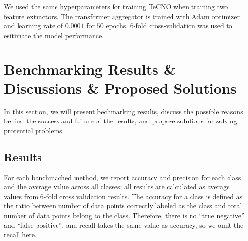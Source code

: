 \documentclass[11pt]{article} \usepackage[top=1in, bottom=1in, left=1in, right=1in]{geometry}
\begin{document}
\vspace{0.25cm}
\noindent
We used the same hyperparameters for training TeCNO when training two feature extractors. The transformer aggregator is trained with Adam optimizer and learning rate of $0.0001$ for $50$ epochs. 6-fold cross-validation was used to esitimate the model performance. 

\section{Benchmarking Results \& Discussions \& Proposed Solutions}
In this section, we will present bechmarking results, discuss the possible reasons behind the success and failure of the results, and propose solutions for solving protential problems.
\subsection{Results}
For each banchmached method, we report accuracy and precision for each class and the average value across all classes; all results are calculated as average values from 6-fold cross validation results. The accuracy for a class is defined as the ratio between number of data points correctly labeled as the class and total number of data points belong to the class. Therefore, there is no ``true negative'' and ``false positive'', and recall takes the same value as accuracy, so we omit the recall here.
\end{document}
